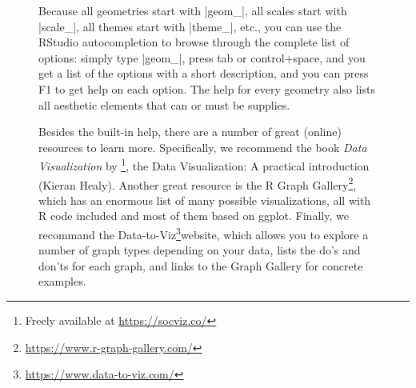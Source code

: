 \begin{figure}
\begin{feature}
Because all geometries start with |geom_|, all scales start with |scale_|, all themes start with |theme_|, etc., you can use the RStudio autocompletion to browse through the complete list of options: simply type |geom_|, press tab or control+space, and you get a list of the options with a short description, and you can press F1 to get help on each option. The help for every geometry also lists all aesthetic elements that can or must be supplies.

\newcommand{\fnviza}{\footnote{Freely available at \url{https://socviz.co/}}}
\newcommand{\fnvizb}{\footnote{\url{https://www.r-graph-gallery.com/}}}
\newcommand{\fnvizc}{\footnote{\url{https://www.data-to-viz.com/}}}

Besides the built-in help, there are a number of great (online) resources to learn more. Specifically, we recommend the book \emph{Data Visualization} by \citet{healy2018data}\fnviza, the 
Data Visualization: A practical introduction (Kieran Healy). Another great resource is the R Graph Gallery\fnvizb, which has an enormous list of many possible visualizations, all with R code included and most of them based on ggplot. Finally, we recommand the Data-to-Viz\fnvizc website, which allows you to explore a number of graph types depending on your data, lists the do's and don'ts for each graph, and links to the Graph Gallery for concrete examples.
\end{feature}
\end{figure}
